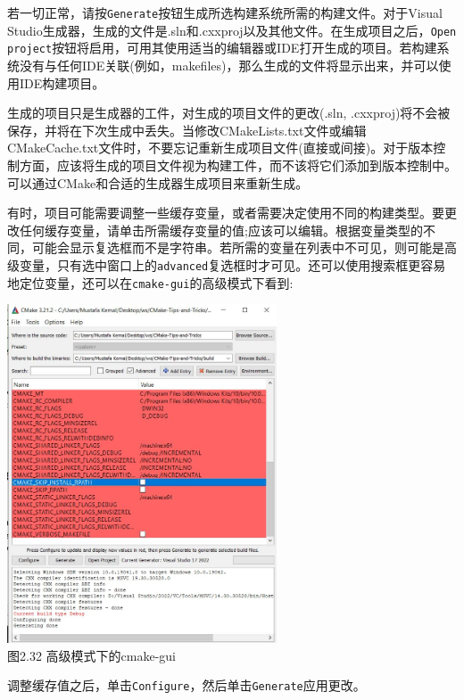 若一切正常，请按\texttt{Generate}按钮生成所选构建系统所需的构建文件。对于Visual Studio生成器，生成的文件是.sln和.cxxproj以及其他文件。在生成项目之后，\texttt{Open project}按钮将启用，可用其使用适当的编辑器或IDE打开生成的项目。若构建系统没有与任何IDE关联(例如，makefiles)，那么生成的文件将显示出来，并可以使用IDE构建项目。

\begin{tcolorbox}[colback=webgreen!5!white,colframe=webgreen!75!black,title=重要Note]
生成的项目只是生成器的工件，对生成的项目文件的更改(.sln, .cxxproj)将不会被保存，并将在下次生成中丢失。当修改CMakeLists.txt文件或编辑CMakeCache.txt文件时，不要忘记重新生成项目文件(直接或间接)。对于版本控制方面，应该将生成的项目文件视为构建工件，而不该将它们添加到版本控制中。可以通过CMake和合适的生成器生成项目来重新生成。
\end{tcolorbox}

有时，项目可能需要调整一些缓存变量，或者需要决定使用不同的构建类型。要更改任何缓存变量，请单击所需缓存变量的值;应该可以编辑。根据变量类型的不同，可能会显示复选框而不是字符串。若所需的变量在列表中不可见，则可能是高级变量，只有选中窗口上的\texttt{advanced}复选框时才可见。还可以使用搜索框更容易地定位变量，还可以在\texttt{cmake-gui}的高级模式下看到:

\begin{center}
\includegraphics[width=0.6\textwidth]{content/1/chapter2/images/32.jpg}\\
图2.32 高级模式下的cmake-gui
\end{center}

调整缓存值之后，单击\texttt{Configure}，然后单击\texttt{Generate}应用更改。


